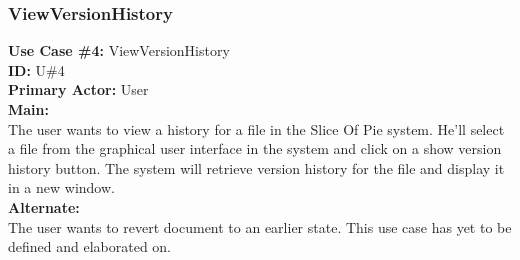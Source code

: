 \subsubsection{ViewVersionHistory}
\textbf{Use Case \#4:} ViewVersionHistory\\
\textbf{ID:} U\#4\\
\newline
\textbf{Primary Actor:} User\\
\textbf{Main:}\\
The user wants to view a history for a file in the Slice Of Pie system. He'll select a file from the graphical user interface in the system and click on a show version history button. The system will retrieve version history for the file and display it in a new window. \\
\textbf{Alternate:}\\
The user wants to revert document to an earlier state. This use case has yet to be defined and elaborated on.\\
\newpage